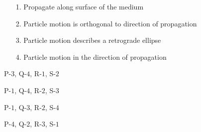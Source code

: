 \documentclass[12pt,fleqn]{article}
\theoremstyle{remark}
\begin{document}
\begin{enumerate}[label=Q.\arabic*.,font=\bfseries, start = 21]
\begin{multicols}{2}
            \columnbreak
            
            \begin{itemize}
                \item [1.] Propagate along surface of the medium
                \item [2.] Particle motion is orthogonal to direction of propagation
                \item [3.] Particle motion describes a retrograde ellipse
                \item [4.] Particle motion in the direction of propagation
            \end{itemize}           

        \end{multicols}
            \begin {enumerate}
                \begin{multicols}{2}
                    \item P-$3$, Q-$4$, R-$1$, S-$2$
                    \item P-$1$, Q-$4$, R-$2$, S-$3$
                    \item P-$1$, Q-$3$, R-$2$, S-$4$
                    \item P-$4$, Q-$2$, R-$3$, S-$1$
                \end{multicols}
            \end{enumerate}
    

\end{enumerate}
\end{document}
